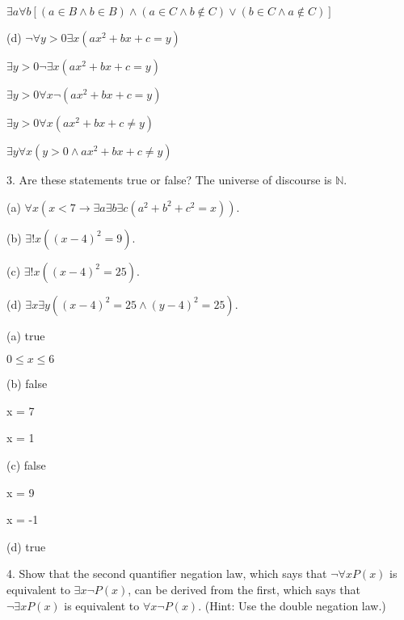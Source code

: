 \documentclass{article}
\begin{document}
$\exists a \forall b [(a \in B \land b \in B) \land (a \in C \land b \notin C) \lor (b \in C \land a \notin C)]$

\vspace{20pt}

(d) $\neg \forall y > 0 \exists x(ax^2 + bx + c = y)$

$\exists y > 0 \neg \exists x (ax^2 + bx + c = y)$

$\exists y > 0 \forall x \neg (ax^2 + bx + c = y)$

$\exists y > 0 \forall x (ax^2 + bx + c \neq y)$

$\exists y \forall x (y > 0 \land ax^2 + bx + c \neq y)$

\vspace{30pt}

3. Are these statements true or false? The universe of discourse is $\mathbb{N}$.

\hspace{12pt}(a) $\forall x (x < 7 \to \exists a \exists b \exists c(a^2 + b^2 + c^2 = x))$.

\hspace{12pt}(b) $\exists ! x ((x - 4)^2 = 9)$.

\hspace{12pt}(c) $\exists ! x ((x - 4)^2 = 25)$.

\hspace{12pt}(d) $\exists x \exists y ((x - 4)^2 = 25 \land (y - 4)^2 = 25)$.
\vspace{30pt}

(a) true

$0 \leq x \leq 6$

\vspace{20pt}

(b) false

x = 7

x = 1

\vspace{20pt}

(c) false

x = 9

x = -1

\vspace{20pt}

(d) true

\vspace{30pt}

4. Show that the second quantifier negation law, which says that $\neg \forall x P(x)$
is equivalent to $\exists x \neg P(x)$, can be derived from the first, which says that
$\neg \exists x P(x)$ is equivalent to $\forall x \neg P(x)$. (Hint: Use the double negation law.)
\vspace{30pt}
\end{document}
